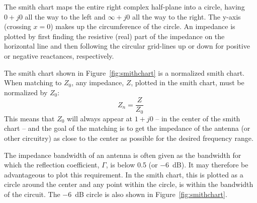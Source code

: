The smith chart maps the entire right complex half-plane into a circle, having $0+j0$ all the way to the left and $\infty+j0$ all the way to the right. The y-axis (crossing $x=0$) makes up the circumference of the circle. An impedance is plotted by first finding the resistive (real) part of the impedance on the horizontal line and then following the circular grid-lines up or down for positive or negative reactances, respectively. 

The smith chart shown in Figure~\ref{fig:smithchart} is a normalized smith chart. When matching to $Z_0$, any impedance, $Z$, plotted in the smith chart, must be normalized by $Z_0$:
\begin{equation}
    Z_n = \frac{Z}{Z_0}
\end{equation}
This means that $Z_0$ will always appear at $1+j0$ -- in the center of the smith chart -- and the goal of the matching is to get the impedance of the antenna (or other circuitry) as close to the center as possible for the desired frequency range.

The impedance bandwidth of an antenna is often given as the bandwidth for which the reflection coefficient, $\Gamma$, is below 0.5 (or \SI{-6}{dB}). It may therefore be advantageous to plot this requirement. In the smith chart, this is plotted as a circle around the center and any point within the circle, is within the bandwidth of the circuit. The \SI{-6}{dB} circle is also shown in Figure~\ref{fig:smithchart}.



